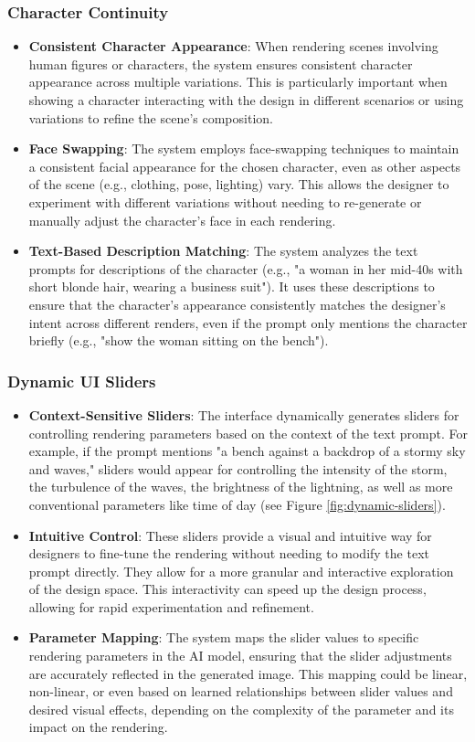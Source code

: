 \documentclass{article}
\begin{document}
\subsubsection{Character Continuity}
\begin{itemize}
\item \textbf{Consistent Character Appearance}: When rendering scenes involving human figures or characters, the system ensures consistent character appearance across multiple variations. This is particularly important when showing a character interacting with the design in different scenarios or using variations to refine the scene's composition.
\item \textbf{Face Swapping}: The system employs face-swapping techniques to maintain a consistent facial appearance for the chosen character, even as other aspects of the scene (e.g., clothing, pose, lighting) vary. This allows the designer to experiment with different variations without needing to re-generate or manually adjust the character's face in each rendering.
\item \textbf{Text-Based Description Matching}: The system analyzes the text prompts for descriptions of the character (e.g., "a woman in her mid-40s with short blonde hair, wearing a business suit"). It uses these descriptions to ensure that the character's appearance consistently matches the designer's intent across different renders, even if the prompt only mentions the character briefly (e.g., "show the woman sitting on the bench").
\end{itemize}

\subsubsection{Dynamic UI Sliders}
\begin{itemize}
\item \textbf{Context-Sensitive Sliders}: The interface dynamically generates sliders for controlling rendering parameters based on the context of the text prompt. For example, if the prompt mentions "a bench against a backdrop of a stormy sky and waves," sliders would appear for controlling the intensity of the storm, the turbulence of the waves, the brightness of the lightning, as well as more conventional parameters like time of day (see Figure \ref{fig:dynamic-sliders}).
\item \textbf{Intuitive Control}: These sliders provide a visual and intuitive way for designers to fine-tune the rendering without needing to modify the text prompt directly. They allow for a more granular and interactive exploration of the design space. This interactivity can speed up the design process, allowing for rapid experimentation and refinement.
\item \textbf{Parameter Mapping}: The system maps the slider values to specific rendering parameters in the AI model, ensuring that the slider adjustments are accurately reflected in the generated image. This mapping could be linear, non-linear, or even based on learned relationships between slider values and desired visual effects, depending on the complexity of the parameter and its impact on the rendering.
\end{itemize}
\end{document}
